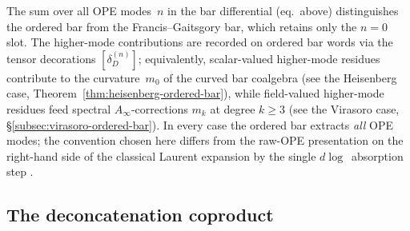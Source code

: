 \begin{remark}
\label{rem:ord-vs-fg-all-modes}
The sum over all OPE modes~$n$ in the bar differential
\textup{(}eq.~above\textup{)} distinguishes the ordered bar
from the Francis--Gaitsgory bar, which retains only the
$n=0$ slot. The higher-mode contributions are recorded on
ordered bar words via the tensor decorations
$[\delta_D^{(n)}]$; equivalently, scalar-valued higher-mode
residues contribute to the curvature~$m_0$ of the curved
bar coalgebra \textup{(}see the Heisenberg case,
Theorem~\ref{thm:heisenberg-ordered-bar}\textup{)}, while
field-valued higher-mode residues feed spectral
$A_\infty$-corrections $m_k$ at degree $k\ge3$
\textup{(}see the Virasoro case,
\S\ref{subsec:virasoro-ordered-bar}\textup{)}.
In every case the ordered bar extracts \emph{all} OPE modes;
the convention chosen here differs from the raw-OPE
presentation on the right-hand side of the classical
Laurent expansion by the single $d\log$~absorption step
.
\end{remark}

\subsection{The deconcatenation coproduct}
\label{subsec:deconcatenation}


